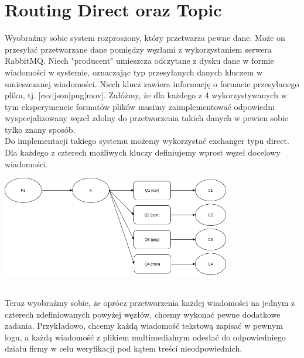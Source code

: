 \documentclass{article}
\begin{document}
    \section{Routing Direct oraz Topic}
        Wyobraźmy sobie system rozproszony, który przetwarza pewne dane. Może on przesyłać przetwarzane dane pomiędzy węzłami z wykorzystaniem serwera RabbitMQ. Niech "producent" umieszcza odczytane z dysku dane w formie wiadomości w systemie, oznaczając typ przesyłanych danych kluczem w umieszczanej wiadomości. 
        Niech klucz zawiera informację o formacie przesyłanego pliku, tj. [csv|json|png|mov]. 
        Załóżmy, że dla każdego z 4 wykorzystywanych w tym eksperymencie formatów plików musimy zaimplementować odpowiedni wyspecjalizowany węzeł zdolny do przetworzenia takich danych w pewien sobie tylko znany sposób.\\
        Do implementacji takiego systemu możemy wykorzystać exchanger typu direct. Dla każdego z czterech możliwych kluczy definiujemy wprost węzeł docelowy wiadomości. 
        \begin{center}
            \includegraphics[width=10cm]{lab2/report/ex3_1.png}
        \end{center}\\
        Teraz wyobraźmy sobie, że oprócz przetworzenia każdej wiadomości na jednym z czterech zdefiniowanych powyżej węzłów, chcemy wykonać pewne dodatkowe zadania. Przykładowo, chcemy każdą wiadomość tekstową zapisać w pewnym logu, a każdą wiadomość z plikiem multimedialnym odesłać do odpowiedniego działu firmy w celu weryfikacji pod kątem treści nieodpowiednich.\\
\end{document}
